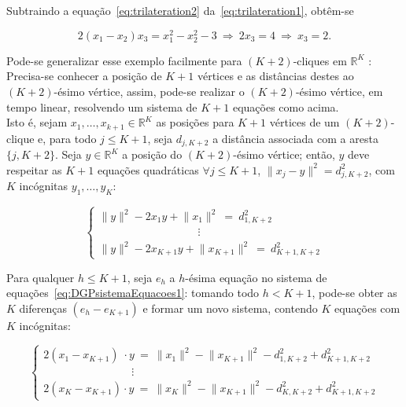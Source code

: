 Subtraindo a equação~\ref{eq:trilateration2} da~\ref{eq:trilateration1}, obtêm-se

\begin{equation*}
	2(x_1-x_2)x_3 = x_1^2 - x_2^2 - 3 \ \Rightarrow \ 2x_3 = 4 \ \Rightarrow \ x_3 = 2.
\end{equation*}

Pode-se generalizar esse exemplo facilmente para $(K+2)$-cliques em $\mathbb{R}^{K}$ \cite{libertiEDG}: Precisa-se conhecer a posição de $K+1$ vértices e as distâncias destes ao $(K+2)$-ésimo vértice, assim, pode-se realizar o $(K+2)$-ésimo vértice, em tempo linear, resolvendo um sistema de $K+1$ equações como acima.
\\

Isto é, sejam $x_1, \dots, x_{k+1} \in \mathbb{R}^{K}$ as posições para $K+1$ vértices de um $(K+2)$-clique e, para todo $j\leq K+1$, seja $d_{j,K+2}$ a distância associada com a aresta $\{j, K+2\}$. Seja $y \in \mathbb{R}^{K}$ a posição do $(K+2)$-ésimo vértice; então, $y$ deve respeitar as $K+1$ equações quadráticas $\forall j\leq K+1$, $\lVert x_j-y\rVert^2 = d_{j,K+2}^2$, com $K$ incógnitas  $y_1, \dots,y_{K}$:

\begin{equation}
	\begin{cases} 
		\lVert y \rVert^2 -2x_1y + \lVert x_1\rVert^2 \ = \ d^2_{1,K+2}
		\\
		\qquad\qquad\qquad\quad\qquad \!\vdots
		\\
		\lVert y \rVert^2 -2x_{K+1}y + \lVert x_{K+1}\rVert^2 \ = \ d^2_{K+1,K+2}
	\end{cases}
	\label{eq:DGPsistemaEquacoes1}
\end{equation}

Para qualquer $h\leq K+1$, seja $e_h$ a $h$-ésima equação no sistema de equações~\ref{eq:DGPsistemaEquacoes1}: tomando todo $h<K+1$, pode-se obter as $K$ diferenças $(e_h-e_{K+1})$ e formar um novo sistema,  contendo $K$ equações com $K$ incógnitas:

\begin{equation}
\begin{cases} 
2(x_1-x_{K+1}) \;\cdot y \ = \ \lVert x_1\rVert^2 - \lVert x_{K+1}\rVert^2 - d^2_{1,K+2} + d^2_{K+1,K+2} 
\\
\qquad\qquad\qquad\qquad\!\!\!\vdots
\\
2(x_{K}-x_{K+1}) \cdot y \ = \ \lVert x_{K}\rVert^2 - \lVert x_{K+1}\rVert^2 - d^2_{K,K+2} + d^2_{K+1,K+2} 
\end{cases}
\label{eq:DGPsistemaEquacoes2}
\end{equation}
\\

